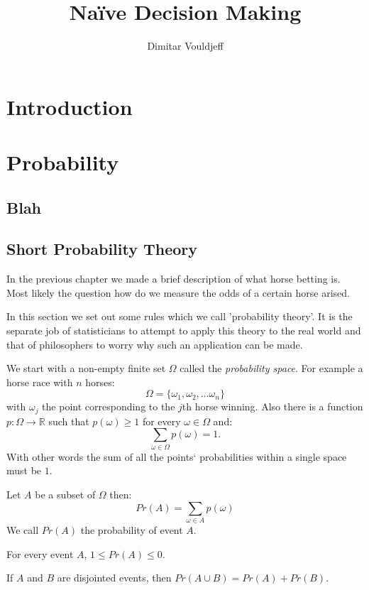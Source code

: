\documentclass[12pt, a4paper,leqno]{report}
\title{Naïve Decision Making}
\author{Dimitar Vouldjeff}
\begin{document}
\maketitle
\tableofcontents

\chapter{Introduction}


\chapter{Probability}

\section{Blah}


\section{Short Probability Theory}
In the previous chapter we made a brief description of what horse betting is. Most likely the question how do we measure the odds of a certain horse arised.

In this section we set out some rules which we call 'probability theory'. It is the separate job of statisticians to attempt to apply this theory to the real world and that of philosophers to worry why such an application can be made.

We start with a non-empty finite set $\Omega$ called the \textit{probability space}. For example a horse race with $n$ horses:
\[ \Omega = \lbrace \omega_1, \omega_2, \dots\omega_n \rbrace \]
with $\omega_j$ the point corresponding to the $j$th horse winning.
Also there is a function $p : \Omega \rightarrow \mathbb{R}$ such that $p(\omega)\geq 1$ for every $\omega\in\Omega$ and:
\[ \sum\limits_{\omega\in\Omega} p(\omega) = 1. \]
With other words the sum of all the points` probabilities within a single space must be $1$.

Let $A$ be a subset of $\Omega$ then:
\[ Pr(A) = \sum\limits_{\omega\in A} p(\omega) \]
We call $Pr(A)$ the probability of event $A$.

\begin{list}{•}{\textbf{Properties}:}
	\item For every event $A$, $1 \leq Pr(A) \leq 0$.
	\item If $A$ and $B$ are disjointed events, then $Pr(A\cup B) = Pr(A) + Pr(B)$.
\end{list}
\end{document}
